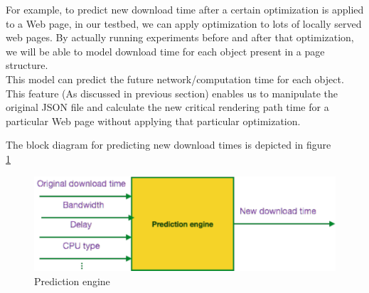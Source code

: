 \noindent For example, to predict new download time after a certain optimization is applied to a Web page, in our testbed, we can apply optimization to lots of locally served web pages. By actually running experiments before and after that optimization, we will be able to model download time for each object present in a page structure.\\
\noindent This model can predict the future network/computation time for each object. This feature (As discussed in previous section) enables us to manipulate the original JSON file and calculate the new critical rendering path time for a particular Web page without applying that particular optimization.

\noindent The block diagram for predicting new download times is depicted in figure \\\ref{fig:predictionengine} 

\begin{figure}[!htb]
  \centering
    \includegraphics[width=0.85 \textwidth]{./figures/optimization/predictionengine.pdf}
  \caption {Prediction engine}
  \label{fig:predictionengine}
\end{figure}

